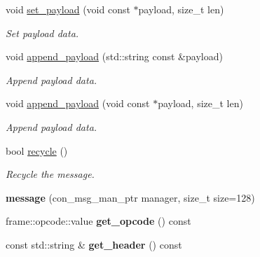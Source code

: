 \begin{DoxyCompactItemize}
void \mbox{\hyperlink{classwebsocketpp_1_1message__buffer_1_1message_a714fd661ca04196d2e5b5834f83512aa}{set\+\_\+payload}} (void const $\ast$payload, size\+\_\+t len)
\begin{DoxyCompactList}\small\item\em Set payload data. \end{DoxyCompactList}\item 
void \mbox{\hyperlink{classwebsocketpp_1_1message__buffer_1_1message_addb7f631d522de382d5dd668a1b66020}{append\+\_\+payload}} (std\+::string const \&payload)
\begin{DoxyCompactList}\small\item\em Append payload data. \end{DoxyCompactList}\item 
void \mbox{\hyperlink{classwebsocketpp_1_1message__buffer_1_1message_a85cbf746725a6e34fef2b51604a29c71}{append\+\_\+payload}} (void const $\ast$payload, size\+\_\+t len)
\begin{DoxyCompactList}\small\item\em Append payload data. \end{DoxyCompactList}\item 
bool \mbox{\hyperlink{classwebsocketpp_1_1message__buffer_1_1message_a2c19e247389598d9f81c9447ddcfba51}{recycle}} ()
\begin{DoxyCompactList}\small\item\em Recycle the message. \end{DoxyCompactList}\item 
\mbox{\label{classwebsocketpp_1_1message__buffer_1_1message_ae5708790af579115f87466d958160d9e}} 
{\bfseries message} (con\+\_\+msg\+\_\+man\+\_\+ptr manager, size\+\_\+t size=128)
\item 
\mbox{\label{classwebsocketpp_1_1message__buffer_1_1message_aa8f82b2e145e1d52ce4a537c3df40389}} 
frame\+::opcode\+::value {\bfseries get\+\_\+opcode} () const
\item 
\mbox{\label{classwebsocketpp_1_1message__buffer_1_1message_a8e8f956bbfd499870da784d36bb117a9}} 
const std\+::string \& {\bfseries get\+\_\+header} () const
\item 
\mbox{\label{classwebsocketpp_1_1message__buffer_1_1message_a12a37641158f68e0564109153355adb1}} 

\end{DoxyCompactItemize}

